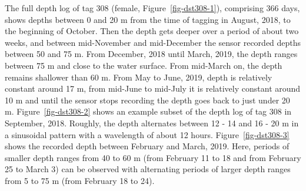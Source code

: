 \documentclass[
  authoryear,
  review,
  3p]{elsarticle}
\begin{document}
The full depth log of tag 308 (female, Figure~\ref{fig-dst308-1}),
comprising 366 days, shows depths between 0 and 20 m from the time of
tagging in August, 2018, to the beginning of October. Then the depth
gets deeper over a period of about two weeks, and between mid-November
and mid-December the sensor recorded depths between 50 and 75 m. From
December, 2018 until March, 2019, the depth ranges between 75 m and
close to the water surface. From mid-March on, the depth remains
shallower than 60 m. From May to June, 2019, depth is relatively
constant around 17 m, from mid-June to mid-July it is relatively
constant around 10 m and until the sensor stops recording the depth goes
back to just under 20 m. Figure~\ref{fig-dst308-2} shows an example
subset of the depth log of tag 308 in September, 2018. Roughly, the
depth alternates between 12 - 14 and 16 - 20 m in a sinusoidal pattern
with a wavelength of about 12 hours. Figure~\ref{fig-dst308-3} shows the
recorded depth between February and March, 2019. Here, periods of
smaller depth ranges from 40 to 60 m (from February 11 to 18 and from
February 25 to March 3) can be observed with alternating periods of
larger depth ranges from 5 to 75 m (from February 18 to 24).
\end{document}

